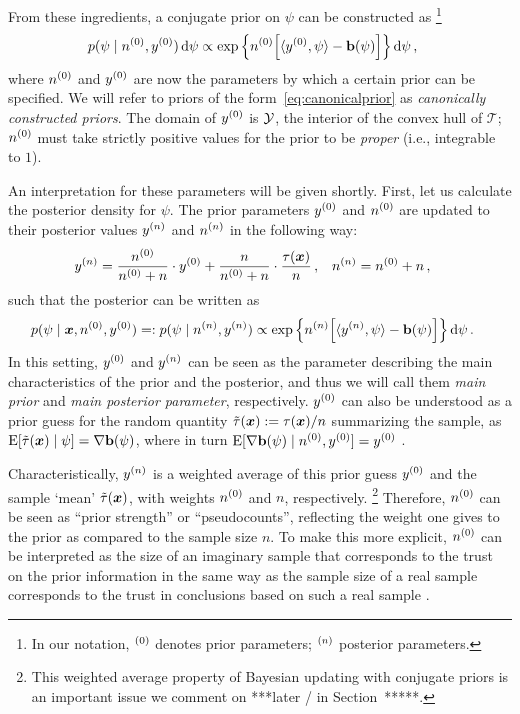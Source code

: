 From these ingredients, a conjugate prior on $\psi$ can be constructed as%
\footnote{In our notation, ${}^{(0)}$ denotes prior parameters; ${}^{(n)}$ posterior parameters.}
\begin{align}
\label{eq:canonicalprior}
p(\psi \mid n^{(0)}, y^{(0)}) \,\mathrm{d}\psi
 &\propto \exp\Big\{ n^{(0)} \Big[ \langle y^{(0)}, \psi \rangle - \mathbf{b}(\psi) \Big] \Big\} \,\mathrm{d}\psi\,,
\end{align}
where $n^{(0)}$ and $y^{(0)}$ are now the parameters by which a certain prior can be specified.
We will refer to priors of the form~\eqref{eq:canonicalprior} as \emph{canonically constructed priors}.
The domain of $y^{(0)}$ is $\mathcal{Y}$, the interior of the convex hull of $\mathcal{T}$;
$n^{(0)}$ must take strictly positive values for the prior to be \emph{proper} (i.e., integrable to $1$).

An interpretation for these parameters will be given shortly.
First, let us calculate the posterior density for $\psi$.
The prior parameters $y^{(0)}$ and $n^{(0)}$ are updated to their posterior values $y^{(n)}$ and $n^{(n)}$ in the following way:
\begin{align}\label{eq:canonicalupdate}
y^{(n)} &= \frac{n^{(0)}}{n^{(0)} + n} \cdot y^{(0)} + \frac{n}{n^{(0)} + n} \cdot \frac{\tau({\bm x})}{n}\,, &
n^{(n)} &= n^{(0)} + n\,,
\end{align}
such that the posterior can be written as
\begin{align}\label{eq:canonicalposterior}
p(\psi \mid {\bm x}, n^{(0)}, y^{(0)})
 =: p(\psi \mid n^{(n)}, y^{(n)})
 &\propto \exp\Big\{ n^{(n)} \Big[ \langle y^{(n)}, \psi \rangle - \mathbf{b}(\psi) \Big] \Big\} \,\mathrm{d}\psi\,.
\end{align}
In this setting, $y^{(0)}$ and $y^{(n)}$ can be seen as the parameter describing the main characteristics of the prior and the posterior,
and thus we will call them \emph{main prior} and \emph{main posterior parameter}, respectively.
$y^{(0)}$ can also be understood as a prior guess for the random quantity $\tilde{\tau}({\bm x}) := \tau({\bm x})/n$ summarizing the sample,
as $\operatorname{E}[\tilde{\tau}({\bm x}) \mid \psi] = \nabla\mathbf{b}(\psi)$,
where in turn $\operatorname{E}[\nabla\mathbf{b}(\psi) \mid n^{(0)}, y^{(0)}] = y^{(0)}$ \parencite[e.g.,][Prop.~5.7, p.~275]{2000:bernardosmith}.

Characteristically, $y^{(n)}$ is a weighted average of this prior guess $y^{(0)}$ and the sample `mean' $\tilde{\tau}({\bm x})$,
with weights $n^{(0)}$ and $n$, respectively.%
\footnote{This weighted average property of Bayesian updating with conjugate priors is an important issue
we comment on ***later / in Section~*****.}
Therefore, $n^{(0)}$ can be seen as ``prior strength'' or ``pseudocounts'',
reflecting the weight one gives to the prior as compared to the sample size $n$.
To make this more explicit, $n^{(0)}$ can be interpreted as the size of an imaginary sample
that corresponds to the trust on the prior information in the same way
as the sample size of a real sample
corresponds to the trust in conclusions based on such a real sample \parencite[p.~258]{Walter2009a}.

